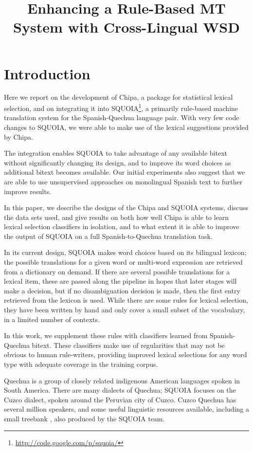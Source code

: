 \documentclass[10pt, a4paper]{article}
\title{Enhancing a Rule-Based MT System with Cross-Lingual WSD}
\begin{document}
\maketitleabstract

\section{Introduction}
Here we report on the development of Chipa, a package for statistical
lexical selection, and on integrating it into
SQUOIA\footnote{\url{http://code.google.com/p/squoia/}}, a primarily rule-based
machine translation system for the Spanish-Quechua language pair.  With very
few code changes to SQUOIA, we were able to make use of the lexical suggestions
provided by Chipa.

The integration enables SQUOIA to take advantage of any available bitext
without significantly changing its design, and to improve its word choices as
additional bitext becomes available. Our initial experiments also suggest that
we are able to use unsupervised approaches on monolingual Spanish text to
further improve results.

In this paper, we describe the designs of the Chipa and SQUOIA systems, discuss
the data sets used, and give results on both how well Chipa is able to learn
lexical selection classifiers in isolation, and to what extent it is able to
improve the output of SQUOIA on a full Spanish-to-Quechua translation task.

In its current design, SQUOIA makes word choices based on its bilingual
lexicon; the possible translations for a given word or multi-word expression
are retrieved from a dictionary on demand. If there are several possible
translations for a lexical item, these are passed along the pipeline in hopes
that later stages will make a decision, but if no disambiguation decision is
made, then the first entry retrieved from the lexicon is used. While there are
some rules for lexical selection, they have been written by hand and only cover
a small subset of the vocabulary, in a limited number of contexts.

In this work, we supplement these rules with classifiers learned from
Spanish-Quechua bitext. These classifiers make use of regularities that may not
be obvious to human rule-writers, providing improved lexical selections for
any word type with adequate coverage in the training corpus.

Quechua is a group of closely related indigenous American languages spoken in
South America. There are many dialects of Quechua; SQUOIA focuses on the
Cuzco dialect, spoken around the Peruvian city of Cuzco.  Cuzco Quechua has
several million speakers, and some useful linguistic resources available,
including a small treebank \cite{rios2009quechua}, also produced by the SQUOIA
team.
\end{document}
